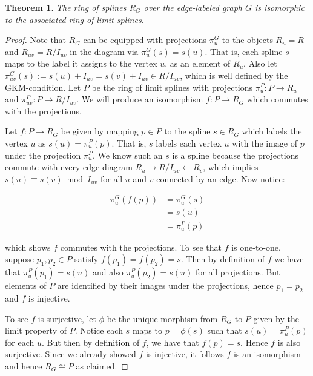 \documentclass{article}
\newtheorem{theorem}{Theorem}
\begin{document}
\begin{theorem}
\label{thm:ring-limit-splines}
The ring of splines $R_{G}$ over the edge-labeled graph $G$ is isomorphic to the associated ring of limit splines.
\end{theorem}
\begin{proof}
Note that $R_{G}$ can be equipped with projections $\pi_u^G$ to the objects $R_u = R$ and $R_{uv} = R/I_{uv}$ in the diagram via $\pi_u^G(s) = s(u)$. That is, each spline $s$ maps to the label it assigns to the vertex $u$, as an element of $R_u$. Also let $\pi_{uv}^G(s):=s(u)+I_{uv}=s(v)+I_{uv}\in R/I_{uv}$, which is well defined by the GKM-condition. Let $P$ be the ring of limit splines with projections $\pi_u^P : P \rightarrow R_u$ and $\pi^P_{uv} : P \rightarrow R/I_{uv}$. We will produce an isomorphism $f: P \rightarrow R_{G}$ which commutes with the projections.

Let $f: P \rightarrow R_{G}$ be given by mapping $p \in P$ to the spline $s \in R_{G}$ which labels the vertex $u$ as $s(u) = \pi_u^P(p)$. That is, $s$ labels each vertex $u$ with the image of $p$ under the projection $\pi_u^P$. We know such an $s$ is a spline because the projections commute with every edge diagram $R_u \rightarrow R/I_{uv} \leftarrow R_v$, which implies $s(u) \equiv s(v) \bmod I_{uv}$ for all $u$ and $v$ connected by an edge. Now notice:

\begin{align*}
  \pi_u^G(f(p)) &= \pi_u^G(s) \\
                &= s(u) \\
                &= \pi_u^P(p)
\end{align*}

which shows $f$ commutes with the projections. To see that $f$ is one-to-one, suppose $p_1, p_2 \in P$ satisfy $f(p_1) = f(p_2) = s$. Then by definition of $f$ we have that $\pi_u^P(p_1) = s(u)$ and also $\pi_u^P(p_2) = s(u)$ for all projections. But elements of $P$ are identified by their images under the projections, hence $p_1=p_2$ and $f$ is injective.

To see $f$ is surjective, let $\phi$ be the unique morphism from $R_{G}$ to $P$ given by the limit property of $P$. Notice each $s$ maps to $p = \phi(s)$ such that $s(u) = \pi_u^P(p)$ for each $u$. But then by definition of $f$, we have that $f(p) = s$. Hence $f$ is also surjective. Since we already showed $f$ is injective, it follows $f$ is an isomorphism and hence $R_{G} \cong P$ as claimed.
\end{proof}
\end{document}
